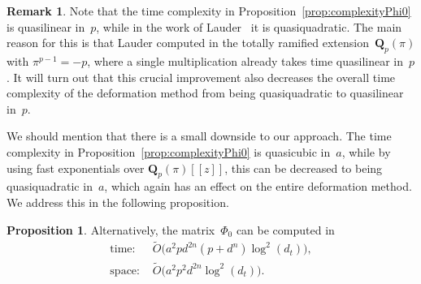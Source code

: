 \documentclass[a4paper,11pt]{article}
\numberwithin{equation}{section}
\newcommand{\QQ}{\mathbf{Q}} %
\providecommand{\SoftOh}{\tilde{O}} %
\theoremstyle{definition}
\newtheorem{prop}[thm]{Proposition}
\newtheorem{rem}[thm]{Remark}
\begin{document}
\begin{rem}
Note that the time complexity in Proposition~\ref{prop:complexityPhi0} 
is quasilinear in~$p$, while in the work of Lauder~\citep{Lauder2004a} 
it is quasiquadratic.  The main reason for this is that Lauder computed 
in the totally ramified extension~$\QQ_p(\pi)$ with $\pi^{p-1}=-p$, 
where a single multiplication already takes time quasilinear in~$p$.  It will turn out 
that this crucial improvement also decreases the overall time complexity 
of the deformation method from being quasiquadratic to quasilinear in~$p$.

We should mention that there is a small downside to our approach.  The time 
complexity in Proposition~\ref{prop:complexityPhi0} is quasicubic in~$a$, 
while by using fast exponentials over $\QQ_p(\pi)[[z]]$, this can be 
decreased to being quasiquadratic in~$a$, which again has an effect on the 
entire deformation method.  We address this in the following proposition.
\end{rem}

\begin{prop} \label{prop:compPhi0}
Alternatively, the matrix~$\Phi_0$ can be computed in 
\begin{align*}
\mbox{time: }  &\SoftOh\bigl(a^2 p d^{2n} (p + d^n) \log^2(d_t) \bigr), \\
\mbox{space: } &\SoftOh\bigl(a^2 p^2 d^{2n} \log^2(d_t)\bigr).
\end{align*}
\end{prop}
\end{document}
